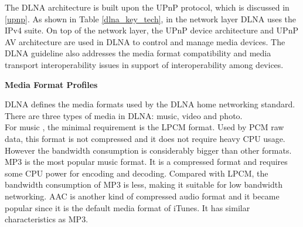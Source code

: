 \begin{table}[htb] 
\caption{Key Technology Ingredients \label{dlna_key_tech}} 
\begin{center} 
\end{center} 
\end{table} 

The DLNA architecture is built upon the UPnP protocol, which is discussed in
\ref{upnp}. As shown in Table \ref{dlna_key_tech}, in the network layer DLNA
uses the IPv4 suite. On top of the network layer, the UPnP device architecture and UPnP AV architecture are used in DLNA to control
and manage media devices. The DLNA guideline also addresses the media format
compatibility and media transport interoperability issues in support of
interoperability among devices.

\textbf{Media Format Profiles}

DLNA defines the media formats used by the DLNA home networking 
standard. There are three types of media in DLNA: music, video and photo.\\
For music , the minimal requirement is the LPCM format. Used by PCM raw data,
this format is not compressed and it does not require heavy CPU usage. However
the bandwidth consumption is considerably bigger than other formats. MP3 is the
most popular music format. It is a compressed format and requires some CPU
power for encoding and decoding. Compared with LPCM, the bandwidth consumption
of MP3 is less, making it suitable for low bandwidth networking. AAC is another
kind of compressed audio format and it became popular since it is the default
media format of iTunes. It has similar characteristics as MP3.

